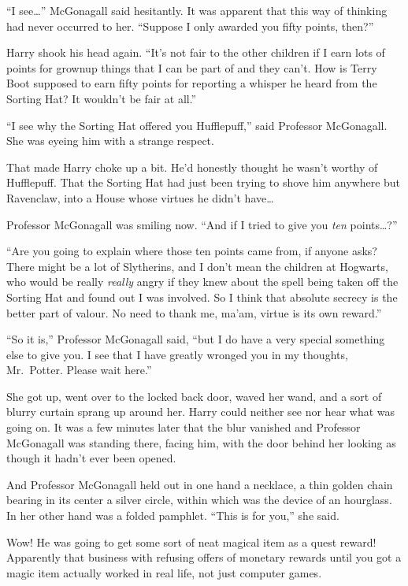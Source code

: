 ``I see\ldots{}'' McGonagall said hesitantly. It was apparent that this
way of thinking had never occurred to her. ``Suppose I only awarded you
fifty points, then?''

Harry shook his head again. ``It's not fair to the other children if I
earn lots of points for grownup things that I can be part of and they
can't. How is Terry Boot supposed to earn fifty points for reporting a
whisper he heard from the Sorting Hat? It wouldn't be fair at all.''

``I see why the Sorting Hat offered you Hufflepuff,'' said Professor
McGonagall. She was eyeing him with a strange respect.

That made Harry choke up a bit. He'd honestly thought he wasn't worthy
of Hufflepuff. That the Sorting Hat had just been trying to shove him
anywhere but Ravenclaw, into a House whose virtues he didn't
have\ldots{}

Professor McGonagall was smiling now. ``And if I tried to give you
\emph{ten} points\ldots{}?''

``Are you going to explain where those ten points came from, if anyone
asks? There might be a lot of Slytherins, and I don't mean the children
at Hogwarts, who would be really \emph{really} angry if they knew about
the spell being taken off the Sorting Hat and found out I was involved.
So I think that absolute secrecy is the better part of valour. No need
to thank me, ma'am, virtue is its own reward.''

``So it is,'' Professor McGonagall said, ``but I do have a very special
something else to give you. I see that I have greatly wronged you in my
thoughts, Mr.~Potter. Please wait here.''

She got up, went over to the locked back door, waved her wand, and a
sort of blurry curtain sprang up around her. Harry could neither see nor
hear what was going on. It was a few minutes later that the blur
vanished and Professor McGonagall was standing there, facing him, with
the door behind her looking as though it hadn't ever been opened.

And Professor McGonagall held out in one hand a necklace, a thin golden
chain bearing in its center a silver circle, within which was the device
of an hourglass. In her other hand was a folded pamphlet. ``This is for
you,'' she said.

Wow! He was going to get some sort of neat magical item as a quest
reward! Apparently that business with refusing offers of monetary
rewards until you got a magic item actually worked in real life, not
just computer games.


